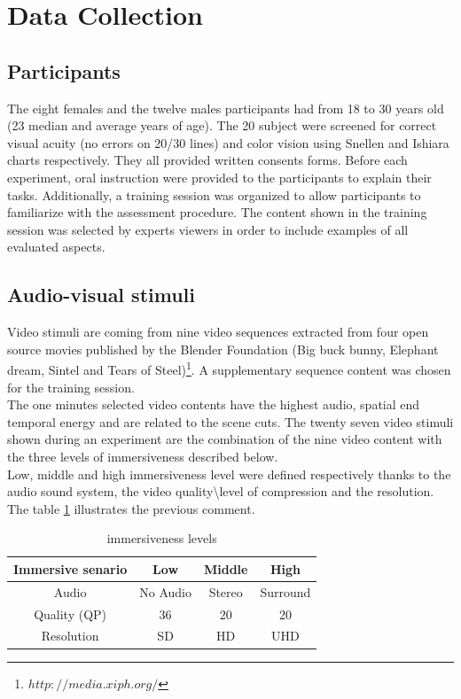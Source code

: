 \section{Data Collection}

\subsection{Participants}
The eight females and the twelve males participants had from 18 to 30 years old (23 median and average years of age). The 20 subject were screened for correct visual acuity (no errors on 20/30 lines) and color vision using Snellen and Ishiara charts respectively. They all provided written consents forms. Before each experiment, oral instruction were provided to the participants to explain their tasks. Additionally, a training session was organized to allow participants to familiarize with the assessment procedure. The content shown in the training session was selected by experts viewers in order to include examples of all evaluated aspects.

\subsection{Audio-visual stimuli}
Video stimuli are coming from nine video sequences extracted from four open source movies published by the Blender Foundation (Big buck bunny, Elephant dream, Sintel and Tears of Steel)\footnote{$http://media.xiph.org/$}. A supplementary sequence content was chosen for the training session.
\\The one minutes selected video contents have the highest audio, spatial end temporal energy and are related to the scene cuts.
The twenty seven video stimuli shown during an experiment are the combination of the nine video content with the three levels of immersiveness described below.
\\Low, middle and high immersiveness level were defined respectively thanks to the audio sound system, the video quality\textbackslash level of compression and the resolution.
The table \ref{IL} illustrates the previous comment.

\begin{table}[h]
\begin{tabular}{ |c || c | c | c | }
   \hline	
   Immersive senario 	& Low 			& Middle 		& High \\
   \hline	
   Audio 				& No Audio 		& Stereo		& Surround \\
   Quality (QP) 		& 36 			& 20			& 20 \\
   Resolution			& SD			& HD			& UHD\\
   \hline	
 \end{tabular}
 \caption{immersiveness levels}
 \label{IL}
 \end{table}

